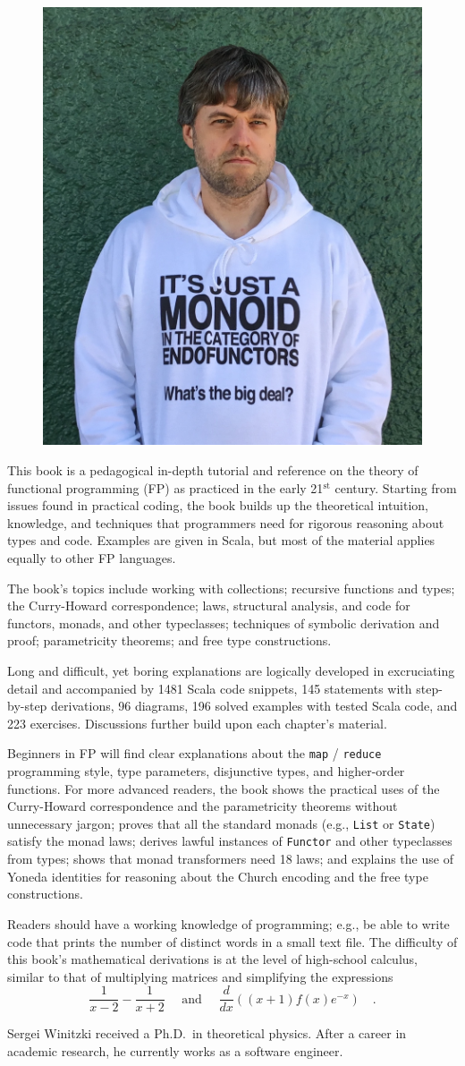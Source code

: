 \documentclass{scrartcl}
\begin{document}
\begin{figure}
\includegraphics[width=0.312\columnwidth]{zloe-lico-monad.jpg}
\vspace{-2.4\baselineskip}
\end{figure}

\noindent
\large
This book is a pedagogical in-depth tutorial and reference
on the theory of functional programming (FP) as practiced in the early
21$^{\text{st}}$ century. Starting from issues found in practical
coding, the book builds up the theoretical intuition, knowledge, and
techniques that programmers need for rigorous reasoning about types
and code. Examples are given in Scala, but most of the material applies equally
to other FP languages.

The book's topics include working with collections; recursive
functions and types; the Curry-Howard correspondence; laws, structural
analysis, and code for functors, monads, and other typeclasses; techniques
of symbolic derivation and proof; parametricity theorems; and free
type constructions.

Long and difficult, yet boring explanations are logically
developed in excruciating detail and accompanied by 1481
Scala code snippets, 145 statements with step-by-step
derivations, 96 diagrams, 196 solved examples
with tested Scala code, and 223 exercises. Discussions
further build upon each chapter's material.

Beginners in FP will find clear explanations about the \texttt{map} / \texttt{reduce}
programming style, type parameters, disjunctive types, and higher-order
functions. For more advanced readers, the book shows  the practical
uses of the Curry-Howard correspondence and the parametricity theorems
without unnecessary jargon; proves that all the standard monads (e.g.,
\texttt{List} or \texttt{State})
satisfy the monad laws; derives lawful instances of \texttt{Functor}
and other typeclasses from types; shows that monad transformers need
18 laws; and explains the use of Yoneda identities for reasoning about
the Church encoding and the free type constructions.

Readers should have a working knowledge of programming; e.g.,
be able to write code that prints the number of distinct words in
a small text file. The difficulty of this book's mathematical derivations
is at the level of high-school calculus, similar to that of multiplying
matrices and simplifying the expressions
\[
\frac{1}{x-2}-\frac{1}{x+2}\quad\text{ and }\quad\frac{d}{dx}\left((x+1)f(x)e^{-x}\right)\quad.
\]

Sergei Winitzki received a Ph.D. in theoretical physics. After a career in academic research, he currently works as a software engineer.
\end{document}
